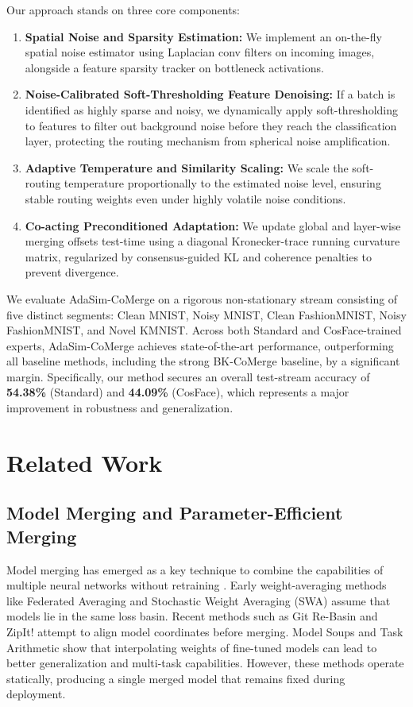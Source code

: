 \documentclass{article}
\theoremstyle{plain}
\theoremstyle{definition}
\theoremstyle{remark}
\begin{document}
Our approach stands on three core components:
\begin{enumerate}
    \item \textbf{Spatial Noise and Sparsity Estimation:} We implement an on-the-fly spatial noise estimator using Laplacian conv filters on incoming images, alongside a feature sparsity tracker on bottleneck activations.
    \item \textbf{Noise-Calibrated Soft-Thresholding Feature Denoising:} If a batch is identified as highly sparse and noisy, we dynamically apply soft-thresholding to features to filter out background noise before they reach the classification layer, protecting the routing mechanism from spherical noise amplification.
    \item \textbf{Adaptive Temperature and Similarity Scaling:} We scale the soft-routing temperature proportionally to the estimated noise level, ensuring stable routing weights even under highly volatile noise conditions.
    \item \textbf{Co-acting Preconditioned Adaptation:} We update global and layer-wise merging offsets test-time using a diagonal Kronecker-trace running curvature matrix, regularized by consensus-guided KL and coherence penalties to prevent divergence.
\end{enumerate}

We evaluate AdaSim-CoMerge on a rigorous non-stationary stream consisting of five distinct segments: Clean MNIST, Noisy MNIST, Clean FashionMNIST, Noisy FashionMNIST, and Novel KMNIST. Across both Standard and CosFace-trained experts, AdaSim-CoMerge achieves state-of-the-art performance, outperforming all baseline methods, including the strong BK-CoMerge baseline, by a significant margin. Specifically, our method secures an overall test-stream accuracy of \textbf{54.38\%} (Standard) and \textbf{44.09\%} (CosFace), which represents a major improvement in robustness and generalization.

\section{Related Work}
\label{sec:related}

\subsection{Model Merging and Parameter-Efficient Merging}
Model merging has emerged as a key technique to combine the capabilities of multiple neural networks without retraining \cite{gitrebasin2023, zipit2023}. Early weight-averaging methods like Federated Averaging \cite{fedavg2017} and Stochastic Weight Averaging (SWA) assume that models lie in the same loss basin. Recent methods such as Git Re-Basin \cite{gitrebasin2023} and ZipIt! \cite{zipit2023} attempt to align model coordinates before merging. Model Soups \cite{modelsoups2022} and Task Arithmetic \cite{taskarithmetic2023} show that interpolating weights of fine-tuned models can lead to better generalization and multi-task capabilities. However, these methods operate statically, producing a single merged model that remains fixed during deployment.
\end{document}
